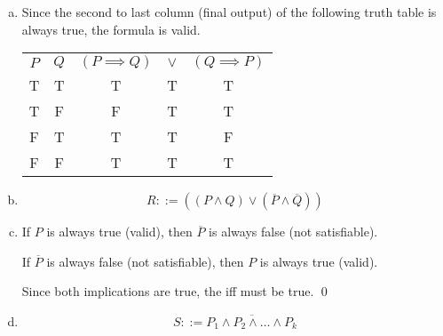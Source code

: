 \documentclass{article}
\begin{document}
\begin{enumerate}[a.]
  \item Since the second to last column (final output) of the following truth
    table is always true, the formula is valid.

    \begin{center}
      \begin{tabular}{ c c c c c }
        $P$ & $Q$ & $(P \implies Q)$ & $\lor$ & $(Q \implies P)$ \\
        T & T & T & T & T \\
        T & F & F & T & T \\
        F & T & T & T & F \\
        F & F & T & T & T
      \end{tabular}
    \end{center}

  \item $$ R ::= ((P \land Q) \lor (\overline{P} \land \overline{Q})) $$

  \item If $P$ is always true (valid), then $\overline{P}$ is always false (not
    satisfiable).

    If $\overline{P}$ is always false (not satisfiable), then $P$ is always true
    (valid).

    \bigbreak

    Since both implications are true, the iff must be true.  \qed

  \item $$ S ::= \overline{P_{1} \land P_{2} \land \dots \land P_{k}} $$

\end{enumerate}
\end{document}
